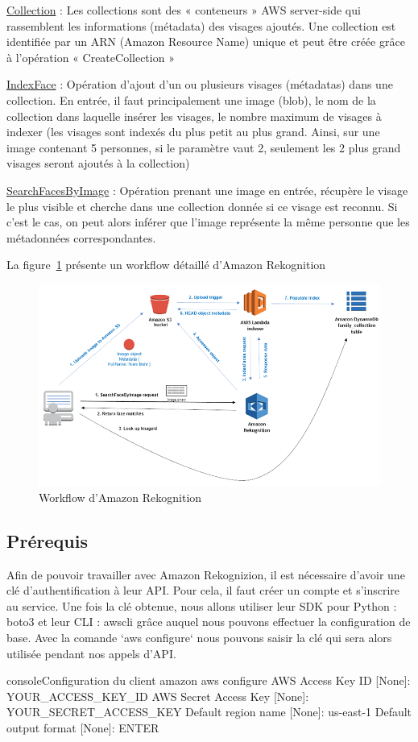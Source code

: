 \underline{Collection} : Les collections sont des « conteneurs » AWS server-side qui rassemblent les informations (métadata)
des visages ajoutés. Une collection est identifiée par un ARN (Amazon Resource Name) unique et peut être créée
grâce à l’opération « CreateCollection »

\underline{IndexFace} : Opération d’ajout d’un ou plusieurs visages (métadatas) dans une collection. En entrée, il faut
principalement une image (blob), le nom de la collection dans laquelle insérer les visages, le nombre maximum de
visages à indexer (les visages sont indexés du plus petit au plus grand. Ainsi, sur une image contenant 5 personnes,
si le paramètre vaut 2, seulement les 2 plus grand visages seront ajoutés à la collection)

\underline{SearchFacesByImage}\label{text:SearchFacesByImage} : Opération prenant une image en entrée, récupère le visage le plus visible et cherche dans
une collection donnée si ce visage est reconnu. Si c’est le cas, on peut alors inférer que l’image représente la même
personne que les métadonnées correspondantes.

La figure~\ref{fig:reko-workflow} présente un workflow détaillé d’Amazon Rekognition

\begin{figure}[H]
	\centering
	\includegraphics[width=12cm]{images/proto-6.png}
	\caption{Workflow d'Amazon Rekognition}
	\label{fig:reko-workflow}
\end{figure}

\subsection{Prérequis}

Afin de pouvoir travailler avec Amazon Rekognizion, il est nécessaire d’avoir une clé d’authentification à leur API.
Pour cela, il faut créer un compte et s’inscrire au service. Une fois la clé obtenue, nous allons utiliser leur SDK pour
Python : boto3  et leur CLI : awscli grâce auquel nous pouvons effectuer la configuration de base.
Avec la comande `aws configure` nous pouvons saisir la clé qui sera alors utilisée pendant nos appels d’API.

\begin{listingsbox}{console}{Configuration du client amazon}
aws configure
AWS Access Key ID [None]:  YOUR_ACCESS_KEY_ID
AWS Secret Access Key [None]: YOUR_SECRET_ACCESS_KEY
Default region name [None]: us-east-1
Default output format [None]: ENTER
\end{listingsbox}